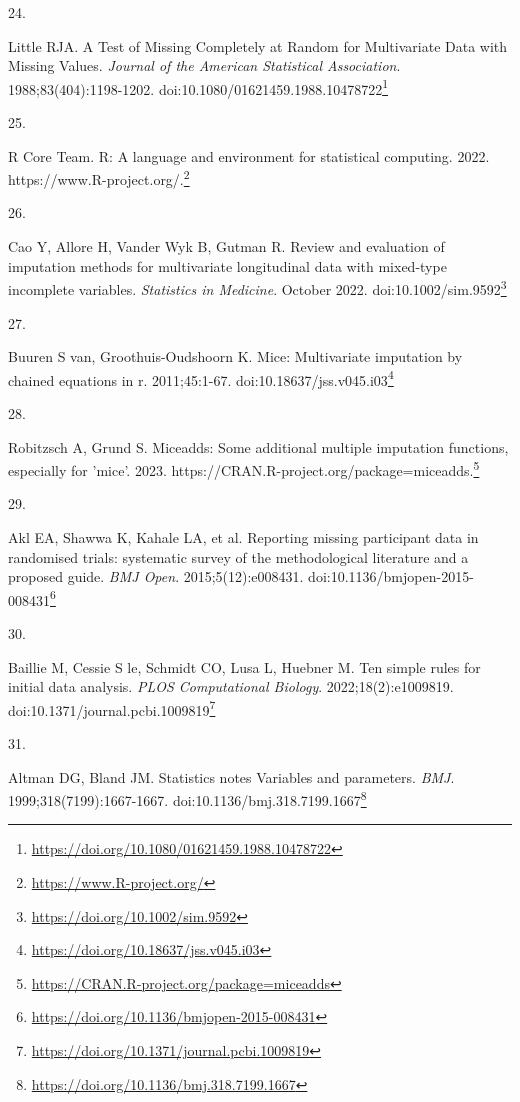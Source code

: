 \documentclass[
]{book}
\newlength{\cslhangindent}
\newlength{\csllabelwidth}
\newlength{\cslentryspacingunit} %
\newenvironment{CSLReferences}[2] %
 {%
  \setlength{\parindent}{0pt}
  \ifodd #1
  \let\oldpar\par
  \def\par{\hangindent=\cslhangindent\oldpar}
  \fi
  \setlength{\parskip}{#2\cslentryspacingunit}
 }%
 {}
\newcommand{\CSLLeftMargin}[1]{\parbox[t]{\csllabelwidth}{#1}}
\newcommand{\CSLRightInline}[1]{\parbox[t]{\linewidth - \csllabelwidth}{#1}\break}
\renewcommand{\href}[2]{#2\footnote{\url{#1}}}
\begin{document}
\begin{CSLReferences}{0}{0}
\leavevmode{}%
\CSLLeftMargin{24. }%
\CSLRightInline{Little RJA. A Test of Missing Completely at Random for Multivariate Data with Missing Values. \emph{Journal of the American Statistical Association}. 1988;83(404):1198-1202. doi:\href{https://doi.org/10.1080/01621459.1988.10478722}{10.1080/01621459.1988.10478722}}

\leavevmode{}%
\CSLLeftMargin{25. }%
\CSLRightInline{R Core Team. R: A language and environment for statistical computing. 2022. \href{https://www.R-project.org/}{https://www.R-project.org/.}}

\leavevmode{}%
\CSLLeftMargin{26. }%
\CSLRightInline{Cao Y, Allore H, Vander Wyk B, Gutman R. Review and evaluation of imputation methods for multivariate longitudinal data with mixed{-}type incomplete variables. \emph{Statistics in Medicine}. October 2022. doi:\href{https://doi.org/10.1002/sim.9592}{10.1002/sim.9592}}

\leavevmode{}%
\CSLLeftMargin{27. }%
\CSLRightInline{Buuren S van, Groothuis-Oudshoorn K. {\textbraceleft}Mice{\textbraceright}: Multivariate imputation by chained equations in r. 2011;45:1-67. doi:\href{https://doi.org/10.18637/jss.v045.i03}{10.18637/jss.v045.i03}}

\leavevmode{}%
\CSLLeftMargin{28. }%
\CSLRightInline{Robitzsch A, Grund S. Miceadds: Some additional multiple imputation functions, especially for 'mice'. 2023. \href{https://CRAN.R-project.org/package=miceadds}{https://CRAN.R-project.org/package=miceadds.}}

\leavevmode{}%
\CSLLeftMargin{29. }%
\CSLRightInline{Akl EA, Shawwa K, Kahale LA, et al. Reporting missing participant data in randomised trials: systematic survey of the methodological literature and a proposed guide. \emph{BMJ Open}. 2015;5(12):e008431. doi:\href{https://doi.org/10.1136/bmjopen-2015-008431}{10.1136/bmjopen-2015-008431}}

\leavevmode{}%
\CSLLeftMargin{30. }%
\CSLRightInline{Baillie M, Cessie S le, Schmidt CO, Lusa L, Huebner M. Ten simple rules for initial data analysis. \emph{PLOS Computational Biology}. 2022;18(2):e1009819. doi:\href{https://doi.org/10.1371/journal.pcbi.1009819}{10.1371/journal.pcbi.1009819}}

\leavevmode{}%
\CSLLeftMargin{31. }%
\CSLRightInline{Altman DG, Bland JM. Statistics notes Variables and parameters. \emph{BMJ}. 1999;318(7199):1667-1667. doi:\href{https://doi.org/10.1136/bmj.318.7199.1667}{10.1136/bmj.318.7199.1667}}


\end{CSLReferences}
\end{document}
